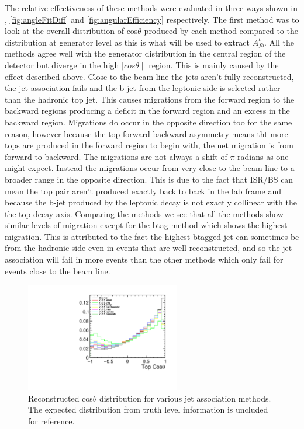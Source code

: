 The relative effectiveness of these methods were evaluated in three ways shown in , \ref{fig:angleFitDiff} and \ref{fig:angularEfficiency} respectively. The first method was to look at the overall distribution of cos$\theta$ produced by each method compared to the distribution at generator level as this is what will be used to extract $A_{fb}^{t}$. All the methods agree well with the generator distribution in the central region of the detector but diverge in the high $\mid cos\theta\mid$ region. This is mainly caused by the effect described above. Close to the beam line the jets aren't fully reconstructed, the jet association fails and the b jet from the leptonic side is selected rather than the hadronic top jet. This causes migrations from the forward region to the backward regions producing a deficit in the forward region and an excess in the backward region. Migrations do occur in the opposite direction too for the same reason, however because the top forward-backward asymmetry means tht more tops are produced in the forward region to begin with, the net migration is from forward to backward. The migrations are not always a shift of $\pi$ radians as one might expect. Instead the migrations occur from very close to the beam line to a broader range in the opposite direction. This is due to the fact that \ac{ISR}/\ac{BS} can mean the top pair aren't produced exactly back to back in the lab frame and because the b-jet produced by the leptonic decay is not exactly collinear with the the top decay axis. Comparing the methods we see that all the methods show similar levels of migration except for the btag method which shows the highest migration. This is attributed to the fact the highest btagged jet can sometimes be from the hadronic side even in events that are well reconstructed, and so the jet association will fail in more events than the other methods which only fail for events close to the beam line.

\begin{figure}
  \centering
  \includegraphics[width=0.6\textwidth]{TopAnalysis/figures/comparejetmethods.pdf}
  \caption[Reconstructed cos$\theta$ distribution for various jet association methods]{Reconstructed cos$\theta$ distribution for various jet association methods. The expected distribution from truth level information is uncluded for reference.}
  \label{fig:methodComparison}
\end{figure}

